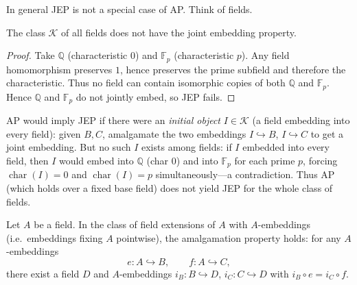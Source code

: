 \begin{remark}
    In general JEP is not a special case of AP. Think of fields.
\end{remark}



\begin{proposition}
    The class $\mathcal{K}$ of all fields does not have the joint embedding property.
\end{proposition}

\begin{proof}
    Take $\mathbb{Q}$ (characteristic $0$) and $\mathbb{F}_p$ (characteristic $p$). Any field
    homomorphism preserves $1$, hence preserves the prime subfield and therefore the characteristic.
    Thus no field can contain isomorphic copies of both $\mathbb{Q}$ and $\mathbb{F}_p$.
    Hence $\mathbb{Q}$ and $\mathbb{F}_p$ do not jointly embed, so JEP fails.
\end{proof}

\begin{remark}
    AP would imply JEP if there were an \emph{initial object} $I\in\mathcal{K}$ (a field
    embedding into every field): given $B,C$, amalgamate the two embeddings $I\hookrightarrow B$,
    $I\hookrightarrow C$ to get a joint embedding. But no such $I$ exists among fields:
    if $I$ embedded into every field, then $I$ would embed into $\mathbb{Q}$ (char $0$) and
    into $\mathbb{F}_p$ for each prime $p$, forcing $\operatorname{char}(I)=0$ and
    $\operatorname{char}(I)=p$ simultaneously---a contradiction. Thus AP (which holds over a fixed
    base field) does not yield JEP for the whole class of fields.
\end{remark}



\begin{proposition}\label{prop:AP-fields}
    Let $A$ be a field. In the class of field extensions of $A$ with $A$-embeddings
    (i.e.\ embeddings fixing $A$ pointwise), the amalgamation property holds:
    for any $A$-embeddings
    \[
        e\colon A\hookrightarrow B,\qquad f\colon A\hookrightarrow C,
    \]
    there exist a field $D$ and $A$-embeddings $i_B\colon B\hookrightarrow D$,
    $i_C\colon C\hookrightarrow D$ with $i_B\circ e=i_C\circ f$.
\end{proposition}

